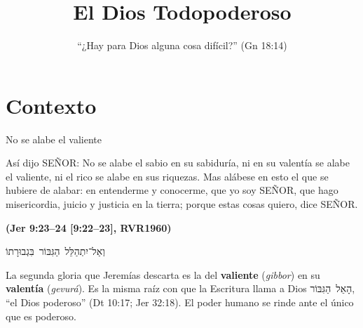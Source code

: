 \documentclass[hyperref={bookmarks=false},aspectratio=169]{beamer}
\title[El Todopoderoso]{\bfseries{El Dios Todopoderoso}}
\subtitle{``¿Hay para Dios alguna cosa difícil?'' (Gn 18:14)}
\author{}\institute{}\date{}
\newcommand{\heb}[1]{\mbox{\foreignlanguage{hebrew}{#1}}}
\newcommand{\SENOR}{S{\fontsize{0.78em}{1em}\selectfont EÑOR}}
\newcommand{\fuente}[1]{\par\hfill{\upshape\bfseries\footnotesize\textcolor{azul}{#1}}}
\newcommand{\destacar}[1]{\textbf{\textcolor{azul}{#1}}}
\begin{document}
\frame{\titlepage}


\section{Contexto}

\begin{frame}{No se alabe el valiente}
\begin{cita}Así dijo \SENOR: No se alabe el sabio en su sabiduría, ni en su valentía se alabe el valiente, ni el rico se alabe en sus riquezas. Mas alábese en esto el que se hubiere de alabar: en entenderme y conocerme, que yo soy \SENOR, que hago misericordia, juicio y justicia en la tierra; porque estas cosas quiero, dice \SENOR.\fuente{(Jer 9:23--24 [9:22--23], RVR1960)}\end{cita}
\begin{center}\heb{וְאַל־יִתְהַלֵּל הַגִּבּוֹר בִּגְבוּרָתוֹ}\end{center}
\small\RaggedRight La segunda gloria que Jeremías descarta es la del \destacar{valiente} (\emph{gibbor}) en su \destacar{valentía} (\emph{gevurá}). Es la misma raíz con que la Escritura llama a Dios \heb{הָאֵל הַגִּבּוֹר}, ``el Dios poderoso'' (Dt 10:17; Jer 32:18). El poder humano se rinde ante el único que es poderoso.
\end{frame}
\end{document}
